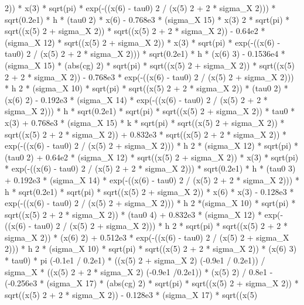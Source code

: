\begin{maplegroup}
 2)) * x(3) * sqrt(pi) * exp(-((x(6) - tau0)  2 / (x(5)  2 + 2 * sigma\_X  2))) * sqrt(0.2e1) * h * (tau0  2) * x(6) - 0.768e3 * (sigma\_X  15) * x(3)  2 * sqrt(pi) * sqrt((x(5)  2 + sigma\_X  2)) * sqrt((x(5)  2 + 2 * sigma\_X  2)) - 0.64e2 * (sigma\_X  12) * sqrt((x(5)  2 + sigma\_X  2)) * x(3) * sqrt(pi) * exp(-((x(6) - tau0)  2 / (x(5)  2 + 2 * sigma\_X  2))) * sqrt(0.2e1) * h * (x(6)  3) - 0.1536e4 * (sigma\_X  15) * (abs(cg)  2) * sqrt(pi) * sqrt((x(5)  2 + sigma\_X  2)) * sqrt((x(5)  2 + 2 * sigma\_X  2)) - 0.768e3 * exp(-((x(6) - tau0)  2 / (x(5)  2 + sigma\_X  2))) * h  2 * (sigma\_X  10) * sqrt(pi) * sqrt((x(5)  2 + 2 * sigma\_X  2)) * (tau0  2) * (x(6)  2) - 0.192e3 * (sigma\_X  14) * exp(-((x(6) - tau0)  2 / (x(5) 2 + 2 * sigma\_X  2))) * h * sqrt(0.2e1) * sqrt(pi) * sqrt((x(5)  2 + sigma\_X  2)) * tau0 * x(3) + 0.768e3 * (sigma\_X  15) * k * sqrt(pi) * sqrt((x(5)  2 + sigma\_X  2)) * sqrt((x(5)  2 + 2 * sigma\_X  2)) + 0.832e3 * sqrt((x(5)  2 + 2 * sigma\_X 2)) * exp(-((x(6) - tau0)  2 / (x(5)  2 + sigma\_X  2))) * h  2 * (sigma\_X  12) * sqrt(pi) * (tau0  2) + 0.64e2 * (sigma\_X  12) * sqrt((x(5)  2 + sigma\_X  2)) * x(3) * sqrt(pi) * exp(-((x(6) - tau0)  2 / (x(5)  2 + 2 * sigma\_X  2))) * sqrt(0.2e1) * h * (tau0  3) + 0.192e3 * (sigma\_X  14) * exp(-((x(6) - tau0)  2 / (x(5)  2 + 2 * sigma\_X  2))) * h * sqrt(0.2e1) * sqrt(pi) * sqrt((x(5)  2 + sigma\_X  2)) * x(6) * x(3) - 0.128e3 * exp(-((x(6) - tau0)  2 / (x(5)  2 + sigma\_X  2))) * h  2 *(sigma\_X  10) * sqrt(pi) * sqrt((x(5)  2 + 2 * sigma\_X  2)) * (tau0  4) + 0.832e3 * (sigma\_X  12) * exp(-((x(6) - tau0)  2 / (x(5)  2 + sigma\_X  2))) * h  2 * sqrt(pi) * sqrt((x(5)  2 + 2 * sigma\_X  2)) * (x(6)  2) + 0.512e3 * exp(-((x(6) - tau0)  2 / (x(5)  2 + sigma\_X  2))) * h  2 * (sigma\_X  10) * sqrt(pi) * sqrt((x(5)  2 + 2 * sigma\_X  2)) * (x(6)  3) * tau0) * pi  (-0.1e1 / 0.2e1) * ((x(5)  2 + sigma\_X  2)  (-0.9e1 / 0.2e1)) / sigma\_X * ((x(5)  2 + 2 * sigma\_X  2)  (-0.9e1 /0.2e1)) * (x(5)  2) / 0.8e1 - (-0.256e3 * (sigma\_X  17) * (abs(cg)  2) * sqrt(pi) * sqrt((x(5)  2 + sigma\_X  2)) * sqrt((x(5)  2 + 2 * sigma\_X  2)) - 0.128e3 * (sigma\_X  17) * sqrt((x(5) 
\end{maplegroup}
